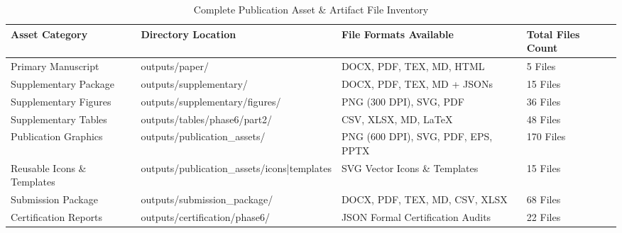 \begin{table}[t]
\centering
\caption{Complete Publication Asset & Artifact File Inventory}
\label{tab:Table_6_04_08_Publication_Asset_and_Artifact_Inventory}
\begin{tabular}{llll}
\toprule
\textbf{Asset Category} & \textbf{Directory Location} & \textbf{File Formats Available} & \textbf{Total Files Count} \\
\midrule
Primary Manuscript & outputs/paper/ & DOCX, PDF, TEX, MD, HTML & 5 Files \\
Supplementary Package & outputs/supplementary/ & DOCX, PDF, TEX, MD + JSONs & 15 Files \\
Supplementary Figures & outputs/supplementary/figures/ & PNG (300 DPI), SVG, PDF & 36 Files \\
Supplementary Tables & outputs/tables/phase6/part2/ & CSV, XLSX, MD, LaTeX & 48 Files \\
Publication Graphics & outputs/publication\_assets/ & PNG (600 DPI), SVG, PDF, EPS, PPTX & 170 Files \\
Reusable Icons \& Templates & outputs/publication\_assets/icons|templates & SVG Vector Icons \& Templates & 15 Files \\
Submission Package & outputs/submission\_package/ & DOCX, PDF, TEX, MD, CSV, XLSX & 68 Files \\
Certification Reports & outputs/certification/phase6/ & JSON Formal Certification Audits & 22 Files \\
\bottomrule
\end{tabular}
\end{table}
